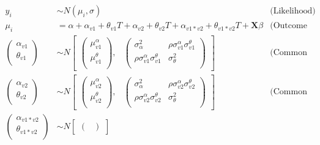 \documentclass[12pt]{article}
\begin{document}
\begin{align*}
y_i &\sim N(\mu_i, \sigma) &\text{(Likelihood)} \\
\mu_i &= \alpha + \alpha_{v1} + \theta_{v1} \textit{T} + \alpha_{v2} + \theta_{v2} \textit{T} + \alpha_{v1*v2} + \theta_{v1*v2} \textit{T} + \textbf{X} \beta &\text{(Outcome Equation)}  \\ 
\begin{pmatrix} 
\alpha_{v1} \\
\theta_{v1} \\
\end{pmatrix} &\sim  N
\begin{bmatrix}
\begin{pmatrix}
\mu^\alpha_{v1} \\
\mu^\theta_{v1} \\
\end{pmatrix}\!\!,&
\begin{pmatrix}
\sigma^2_\alpha & \rho \sigma^\alpha_{v1} \sigma^\theta_{v1} \\
\rho \sigma^\alpha_{v1} \sigma^\theta_{v1} & \sigma^2_\theta \\
\end{pmatrix}
\end{bmatrix} & \text{(Common Prior: V1)} \\ 
\begin{pmatrix} 
\alpha_{v2} \\
\theta_{v2} \\
\end{pmatrix} &\sim  N
\begin{bmatrix}
\begin{pmatrix}
\mu^\alpha_{v2} \\
\mu^\theta_{v2} \\
\end{pmatrix}\!\!,&
\begin{pmatrix}
\sigma^2_\alpha & \rho \sigma^\alpha_{v2} \sigma^\theta_{v2} \\
\rho \sigma^\alpha_{v2} \sigma^\theta_{v2} & \sigma^2_\theta \\
\end{pmatrix}
\end{bmatrix} & \text{(Common Prior: V2)} \\ 
\begin{pmatrix} 
\alpha_{v1*v2} \\
\theta_{v1*v2} \\
\end{pmatrix} &\sim  N
\begin{bmatrix}
\begin{pmatrix}

\end{pmatrix}
\end{bmatrix}
\end{align*}
\end{document}

